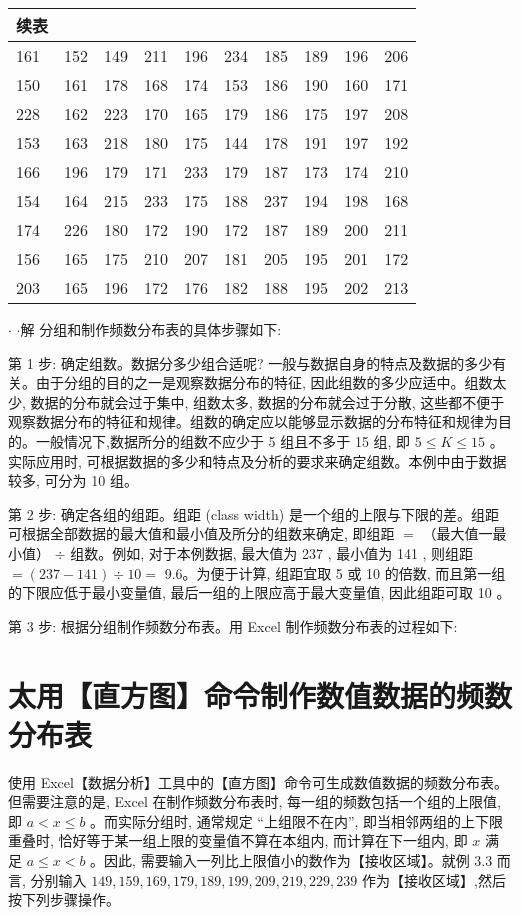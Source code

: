 \documentclass[10pt]{article}
\begin{document}
\begin{CJK*}{UTF8}{bsmi}
\begin{center}
\begin{tabular}{llllllllll}
续表 & \multicolumn{10}{l}{} \\
\hline
161 & 152 & 149 & 211 & 196 & 234 & 185 & 189 & 196 & 206 &  \\
150 & 161 & 178 & 168 & 174 & 153 & 186 & 190 & 160 & 171 &  \\
228 & 162 & 223 & 170 & 165 & 179 & 186 & 175 & 197 & 208 &  \\
153 & 163 & 218 & 180 & 175 & 144 & 178 & 191 & 197 & 192 &  \\
166 & 196 & 179 & 171 & 233 & 179 & 187 & 173 & 174 & 210 &  \\
154 & 164 & 215 & 233 & 175 & 188 & 237 & 194 & 198 & 168 &  \\
174 & 226 & 180 & 172 & 190 & 172 & 187 & 189 & 200 & 211 &  \\
156 & 165 & 175 & 210 & 207 & 181 & 205 & 195 & 201 & 172 &  \\
203 & 165 & 196 & 172 & 176 & 182 & 188 & 195 & 202 & 213 &  \\
\hline
\end{tabular}
\end{center}

$\cdot$ $\cdot$解 分组和制作频数分布表的具体步骤如下:

第 1 步: 确定组数。数据分多少组合适呢? 一般与数据自身的特点及数据的多少有关。由于分组的目的之一是观察数据分布的特征, 因此组数的多少应适中。组数太少, 数据的分布就会过于集中, 组数太多, 数据的分布就会过于分散, 这些都不便于观察数据分布的特征和规律。组数的确定应以能够显示数据的分布特征和规律为目的。一般情况下,数据所分的组数不应少于 5 组且不多于 15 组, 即 $5 \leqslant K \leqslant 15$ 。实际应用时, 可根据数据的多少和特点及分析的要求来确定组数。本例中由于数据较多, 可分为 10 组。

第 2 步: 确定各组的组距。组距 (class width) 是一个组的上限与下限的差。组距可根据全部数据的最大值和最小值及所分的组数来确定, 即组距 $=$ （最大值一最小值） $\div$ 组数。例如, 对于本例数据, 最大值为 237 , 最小值为 141 , 则组距 $=(237-141) \div 10=$ 9.6。为便于计算, 组距宜取 5 或 10 的倍数, 而且第一组的下限应低于最小变量值, 最后一组的上限应高于最大变量值, 因此组距可取 10 。

第 3 步: 根据分组制作频数分布表。用 Excel 制作频数分布表的过程如下:

\section*{太用【直方图】命令制作数值数据的频数分布表}
使用 Excel【数据分析】工具中的【直方图】命令可生成数值数据的频数分布表。但需要注意的是, Excel 在制作频数分布表时, 每一组的频数包括一个组的上限值, 即 $a<x \leqslant b$ 。而实际分组时, 通常规定 “上组限不在内”, 即当相邻两组的上下限重叠时, 恰好等于某一组上限的变量值不算在本组内, 而计算在下一组内, 即 $x$ 满足 $a \leqslant x<b$ 。因此, 需要输入一列比上限值小的数作为【接收区域】。就例 3.3 而言, 分别输入 $149,159,169,179,189,199,209,219,229,239$ 作为【接收区域】,然后按下列步骤操作。


\end{CJK*}
\end{document}
